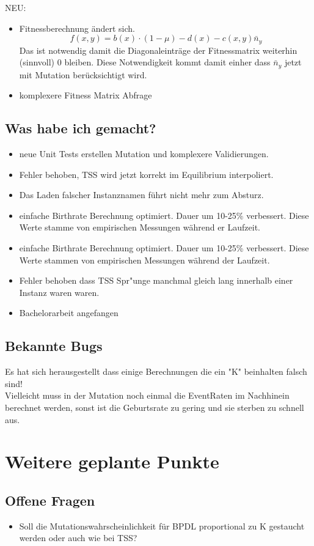 \documentclass{article}
\begin{document}
	NEU:
	\begin{itemize}
		\item Fitnessberechnung ändert sich. 
		\[ f(x,y) = b(x) \cdot (1 - \mu) - d(x) - c(x,y)\bar{n}_y \]
		Das ist notwendig damit die Diagonaleinträge der Fitnessmatrix weiterhin (sinnvoll) 0 bleiben. Diese Notwendigkeit kommt damit einher dass $ \bar{n}_y $ jetzt mit Mutation berücksichtigt wird.
		\item komplexere Fitness Matrix Abfrage
	\end{itemize}
	
\subsection{Was habe ich gemacht?}
	\begin{itemize}
		\item neue Unit Tests erstellen Mutation und komplexere Validierungen.
		\item Fehler behoben, TSS wird jetzt korrekt im Equilibrium interpoliert.
		\item Das Laden falscher Instanznamen führt nicht mehr zum Absturz.
		\item einfache Birthrate Berechnung optimiert. Dauer um 10-25\% verbessert. Diese Werte stamme von empirischen Messungen während er Laufzeit.
		\item einfache Birthrate Berechnung optimiert. Dauer um 10-25\% verbessert. Diese Werte stammen von empirischen Messungen während der Laufzeit.
		\item Fehler behoben dass TSS Spr"unge manchmal gleich lang innerhalb einer Instanz waren waren.
		\item Bachelorarbeit angefangen
	\end{itemize}
\subsection{Bekannte Bugs}
	Es hat sich herausgestellt dass einige Berechnungen die ein "{}K"{} beinhalten falsch sind!\\
	Vielleicht muss in der Mutation noch einmal die EventRaten im Nachhinein berechnet werden, sonst ist die Geburtsrate zu gering und sie sterben zu schnell aus.
	

\section{Weitere geplante Punkte}
\subsection{Offene Fragen}
	\begin{itemize}
		\item Soll die Mutationswahrscheinlichkeit für BPDL proportional zu K gestaucht werden oder auch wie bei TSS?
	\end{itemize}
\end{document}
